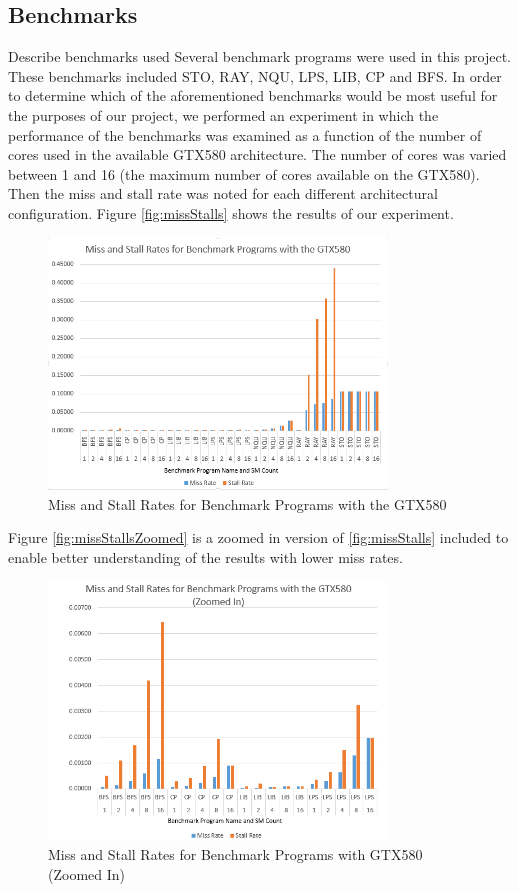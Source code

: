 \subsection{Benchmarks}
Describe benchmarks used 
Several benchmark programs were used in this project. These benchmarks included STO, RAY, NQU, LPS, LIB, CP and BFS. In order to determine which of the aforementioned benchmarks would be most useful for the purposes of our project, we performed an experiment in which the performance of the benchmarks was examined as a function of the number of cores used in the available GTX580 architecture. The number of cores was varied between 1 and 16 (the maximum number of cores available on the GTX580). Then the miss and stall rate was noted for each different architectural configuration. Figure \ref{fig:missStalls} shows the results of our experiment. 

\begin{figure}[b!]
\centering
\includegraphics[width=90mm]{miss_stalls_benchmarks.png}
\caption{Miss and Stall Rates for Benchmark Programs with the GTX580}
\label{missStalls}
\end{figure}

Figure \ref{fig:missStallsZoomed} is a zoomed in version of \ref{fig:missStalls} included to enable better understanding of the results with lower miss rates. 

\begin{figure}[b!]
\centering
\includegraphics[width=90mm]{miss_stalls_benchmarks_zoomed.png}
\caption{Miss and Stall Rates for Benchmark Programs with GTX580 (Zoomed In) }
\label{missStallsZoomed}
\end{figure}

